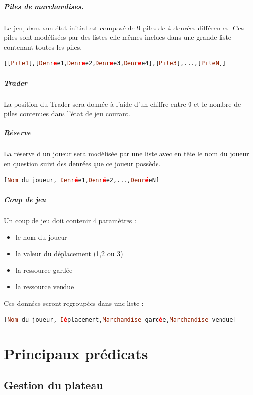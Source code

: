 \documentclass[a4paper, 11pt,twoside, leqno]{report}
\theoremstyle{plain}
\begin{document}
\paragraph{Piles de marchandises.} Le jeu, dans son état initial est composé de 9 piles de 4 denrées différentes. Ces piles sont modélisées par des listes elle-mêmes inclues dans une grande liste contenant toutes les piles.
\begin{lstlisting}[language=prolog]
[[Pile1],[Denrée1,Denrée2,Denrée3,Denrée4],[Pile3],...,[PileN]]
\end{lstlisting}
\paragraph{Trader} La position du Trader sera donnée à l'aide d'un chiffre entre 0 et le nombre de piles contenues dans l'état de jeu courant. 
\paragraph{Réserve}La réserve d'un joueur sera modélisée par une liste avec en tête le nom du joueur en question suivi des denrées que ce joueur possède.
\begin{lstlisting}[language=prolog]
[Nom du joueur, Denrée1,Denrée2,...,DenréeN]
\end{lstlisting}
\paragraph{Coup de jeu}Un coup de jeu doit contenir 4 paramètres : 
\begin{itemize}
	\item le nom du joueur
    \item la valeur du déplacement (1,2 ou 3)
    \item la ressource gardée
    \item la ressource vendue
\end{itemize}
Ces données seront regroupées dans une liste : 
\begin{lstlisting}[language=prolog]
[Nom du joueur, Déplacement,Marchandise gardée,Marchandise vendue]
\end{lstlisting}

\chapter{Principaux prédicats}
\section{Gestion du plateau}
\end{document}
